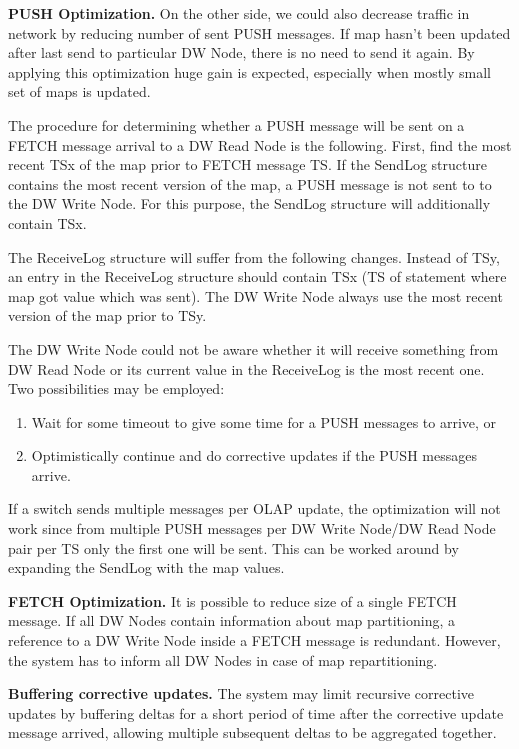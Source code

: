 \documentclass{sig-semester}
\def\OLAP{OLAP\xspace}
\begin{document}
\textbf{PUSH Optimization.} On the other side, we could also decrease traffic in network by reducing number of sent PUSH messages. If map hasn't been updated after last send to particular DW Node, there is no need to send it again. By applying this optimization huge gain is expected, especially when mostly small set of maps is updated. 

The procedure for determining whether a PUSH message will be sent on a FETCH message arrival to a DW Read Node is the following. First, find the most recent TSx of the map prior to FETCH message TS. If the SendLog structure contains the most recent version of the map, a PUSH message is not sent to to the DW Write Node. For this purpose, the SendLog structure will additionally contain TSx.

The ReceiveLog structure will suffer from the following changes. Instead of TSy, an entry in the ReceiveLog structure should contain TSx (TS of statement where map got value which was sent). The DW Write Node always use the most recent version of the map prior to TSy.

The DW Write Node could not be aware whether it will receive something from DW Read Node or its current value in the ReceiveLog is the most recent one. Two possibilities may be employed:
\begin{enumerate}[(1)]
 \item Wait for some timeout to give some time for a PUSH messages to arrive, or
 \item Optimistically continue and do corrective updates if the PUSH messages arrive. 
\end{enumerate}

If a switch sends multiple messages per \OLAP update, the optimization will not work since from multiple PUSH messages per DW Write Node/DW Read Node pair per TS only the first one will be sent. This can be worked around by expanding the SendLog with the map values. 

\textbf{FETCH Optimization.} It is possible to reduce size of a single FETCH message. If all DW Nodes contain information about map partitioning, a reference to a DW Write Node inside a FETCH message is redundant. However, the system has to inform all DW Nodes in case of map repartitioning.

\textbf{Buffering corrective updates.} The system may limit recursive corrective updates by buffering deltas for a short period of time after the corrective update message arrived, allowing multiple subsequent deltas to be aggregated together.
\end{document}
